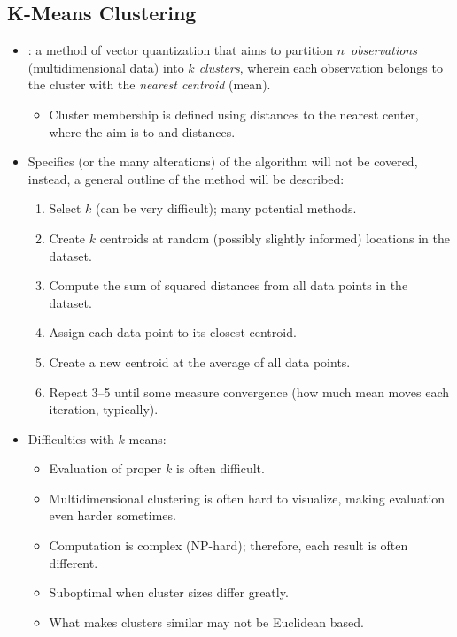 \begin{itemize}
  \subsection{K-Means Clustering}
  \begin{itemize}
    \item {}: a method of vector quantization that aims to partition \emph{\(n\)~observations} (multidimensional data) into \emph{\(k\) clusters}, wherein each observation belongs to the cluster with the \emph{nearest centroid} (mean).
      \begin{itemize}
        \item Cluster membership is defined using distances to the nearest center, where the aim is to  and  distances.
      \end{itemize}
    \item Specifics (or the many alterations) of the algorithm will not be covered, instead, a general outline of the method will be described:
      \begin{enumerate}
        \item Select \(k\) (can be very difficult); many potential methods.
        \item Create \(k\) centroids at random (possibly slightly informed) locations in the dataset.
        \item Compute the sum of squared distances from all data points in the dataset.
        \item Assign each data point to its closest centroid.
        \item Create a new centroid at the average of all data points.
        \item Repeat 3--5 until some measure convergence (how much mean moves each iteration, typically).
      \end{enumerate}
    \item Difficulties with \(k\)-means:
      \begin{itemize}
        \item Evaluation of proper \(k\) is often difficult.
        \item Multidimensional clustering is often hard to visualize, making evaluation even harder sometimes.
        \item Computation is complex (NP-hard); therefore, each result is often different.
        \item Suboptimal when cluster sizes differ greatly.
        \item What makes clusters similar may not be Euclidean based.
      \end{itemize}
  \end{itemize}


\end{itemize}
